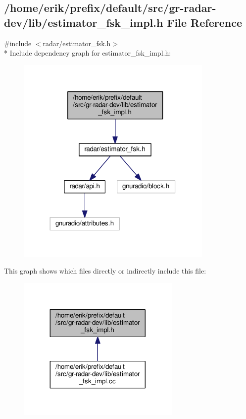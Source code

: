 \subsection{/home/erik/prefix/default/src/gr-\/radar-\/dev/lib/estimator\+\_\+fsk\+\_\+impl.h File Reference}
\label{estimator__fsk__impl_8h}
{\ttfamily \#include $<$radar/estimator\+\_\+fsk.\+h$>$}\\*
Include dependency graph for estimator\+\_\+fsk\+\_\+impl.\+h\+:
\nopagebreak
\begin{figure}[H]
\begin{center}
\leavevmode
\includegraphics[width=270pt]{d9/dfa/estimator__fsk__impl_8h__incl}
\end{center}
\end{figure}
This graph shows which files directly or indirectly include this file\+:
\nopagebreak
\begin{figure}[H]
\begin{center}
\leavevmode
\includegraphics[width=224pt]{d3/df2/estimator__fsk__impl_8h__dep__incl}
\end{center}
\end{figure}
